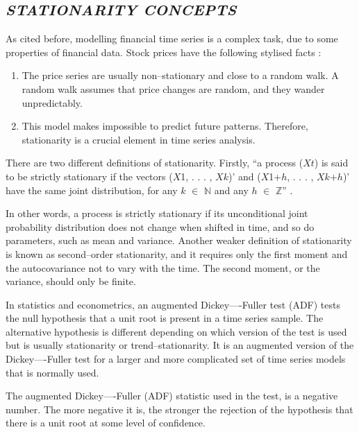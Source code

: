 \documentclass[12pt,a4paper]{report}
\numberwithin{equation}{section}
\begin{document}
\hypertarget{stationarity--concepts}{%
\subsection{\texorpdfstring{\emph{STATIONARITY CONCEPTS}
}{STATIONARITY CONCEPTS }}\label{stationarity--concepts}}

As cited before, modelling financial time series is a complex task, due
to some properties of financial data. Stock prices have the following
stylised facts \cite{francq2010garch_69}:

\begin{enumerate}
\def\labelenumi{\roman{enumi}.}
\item
  The price series are usually non--stationary and close to a random
  walk. A random walk assumes that price changes are random, and they
  wander unpredictably.
\item
  This model makes impossible to predict future patterns. Therefore,
  stationarity is a crucial element in time series analysis.
\end{enumerate}

There are two different definitions of stationarity. Firstly, ``a
process ($X$$t$) is said to be strictly stationary if the vectors ($X$1, . . .
, $X$$k$)' and ($X$1+$h$, . . . , $X$$k$+$h$)' have the same joint distribution, for
any $k$ $\in$ $\mathbb{N}$ and any $h$ $\in$ $\mathbb{Z}$'' \cite{francq2010garch_69}.

In other words, a process is strictly stationary if its unconditional
joint probability distribution does not change when shifted in time, and
so do parameters, such as mean and variance. Another weaker definition
of stationarity is known as second--order stationarity, and it requires
only the first moment and the autocovariance not to vary with the time.
The second moment, or the variance, should only be finite.

In statistics and econometrics, an augmented Dickey----Fuller test (ADF)
tests the null hypothesis that a unit root is present in a time series
sample. The alternative hypothesis is different depending on which
version of the test is used but is usually stationarity or
trend--stationarity. It is an augmented version of the Dickey----Fuller
test for a larger and more complicated set of time series models that is
normally used.

The augmented Dickey----Fuller (ADF) statistic \cite{elliott1996efficient_70} used in the test,
is a negative number. The more negative it is, the stronger the
rejection of the hypothesis that there is a unit root at some level of
confidence.
\end{document}
